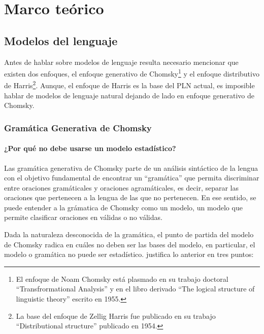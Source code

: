 \chapter{Marco teórico}
\label{ch:chap2}


\section{Modelos del lenguaje}
\label{sec:sec21}

Antes de hablar sobre modelos de lenguaje resulta necesario mencionar que existen dos enfoques, el enfoque generativo de Chomsky\footnote{El enfoque de Noam Chomsky está plasmado en su trabajo doctoral ``Transfrormational Analysis'' y en el libro derivado ``The logical structure of linguistic theory'' escrito en 1955.} y el enfoque distributivo de Harris\footnote{La base del enfoque de Zellig Harris fue publicado en su trabajo ``Distributional structure'' publicado en 1954.}. Aunque, el enfoque de Harris es la base del PLN actual, es imposible hablar de modelos de lenguaje natural dejando de lado en enfoque generativo de Chomsky.

\subsection{Gramática Generativa de Chomsky}
\label{subsec:sec211}


\subsubsection{¿Por qué no debe usarse un modelo estadístico?}
\label{subsubsec:sec2111}

Las gramática generativa de Chomsky parte de un análisis sintáctico de la lengua con el objetivo fundamental de encontrar un ``gramática'' que permita discriminar entre oraciones gramáticales y oraciones agramáticales, es decir, separar las oraciones que pertenecen a la lengua de las que no pertenecen. En ese sentido, se puede entender a la grámatica de Chomsky como un modelo, un modelo que permite clasificar oraciones en válidas o no válidas. 

Dada la naturaleza desconocida de la gramática, el punto de partida del modelo de Chomsky radica en cuáles no deben ser las bases del modelo, en particular, el modelo o gramática no puede ser estadístico. \cite{chomsky2004estructuras} justifica lo anterior en tres puntos:


